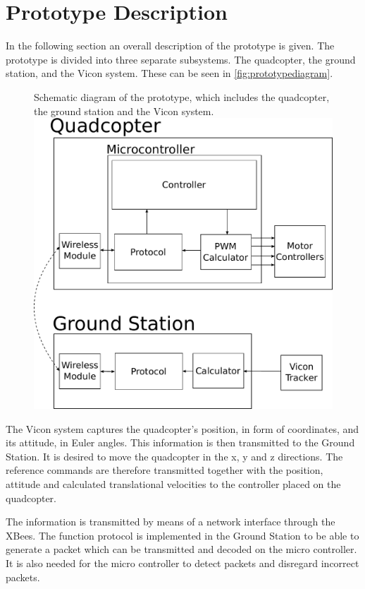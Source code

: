 \section{Prototype Description}\label{sec:PrototypeDescription}
In the following section an overall description of the prototype is given. %
The prototype is divided into three separate subsystems. The quadcopter, the ground station, and the Vicon system. These can be seen in \autoref{fig:prototypediagram}. 
\vspace{-0.2 cm}
\begin{figure}[H]
  \centering
  \captionbox
  {
    Schematic diagram of the prototype, which includes the quadcopter, the ground station and the Vicon system.
    \label{fig:prototypediagram}
  }
  {
    \includegraphics[width=.45\textwidth]{figures/prototypediagram}
  }
\end{figure}
\vspace{-0.7 cm}
The Vicon system captures the quadcopter's position, in form of coordinates, and its attitude, in Euler angles. This information is then transmitted to the Ground Station. It is desired to move the quadcopter in the x, y and z directions. The reference commands are therefore transmitted together with the position, attitude and calculated translational velocities to the controller placed on the quadcopter.

The information is transmitted by means of a network interface through the XBees. The function protocol is implemented in the Ground Station to be able to generate a packet which can be transmitted and decoded on the micro controller. It is also needed for the micro controller to detect packets and disregard incorrect packets.

